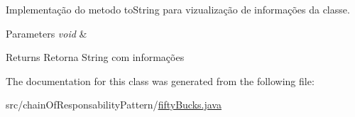 Implementação do metodo to\+String para vizualização de informações da classe. 


\begin{DoxyParams}{Parameters}
{\em void} & \\
\hline
\end{DoxyParams}
\begin{DoxyReturn}{Returns}
Retorna String com informações 
\end{DoxyReturn}


The documentation for this class was generated from the following file\+:\begin{DoxyCompactItemize}
\item 
src/chain\+Of\+Responsability\+Pattern/\mbox{\hyperlink{fifty_bucks_8java}{fifty\+Bucks.\+java}}\end{DoxyCompactItemize}
